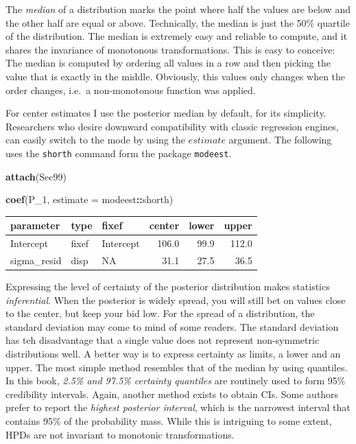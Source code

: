 \documentclass[]{svmono}
\newenvironment{Shaded}{\begin{snugshade}}{\end{snugshade}}
\newcommand{\KeywordTok}[1]{\textcolor[rgb]{0.13,0.29,0.53}{\textbf{#1}}}
\newcommand{\DataTypeTok}[1]{\textcolor[rgb]{0.13,0.29,0.53}{#1}}
\newcommand{\DecValTok}[1]{\textcolor[rgb]{0.00,0.00,0.81}{#1}}
\newcommand{\OperatorTok}[1]{\textcolor[rgb]{0.81,0.36,0.00}{\textbf{#1}}}
\newcommand{\NormalTok}[1]{#1}
\theoremstyle{definition}
\theoremstyle{definition}
\theoremstyle{definition}
\theoremstyle{remark}
\begin{document}
The \emph{median} of a distribution marks the point where half the
values are below and the other half are equal or above. Technically, the
median is just the 50\% quartile of the distribution. The median is
extremely easy and reliable to compute, and it shares the invariance of
monotonous transformations. This is easy to conceive: The median is
computed by ordering all values in a row and then picking the value that
is exactly in the middle. Obviously, this values only changes when the
order changes, i.e.~a non-monotonous function was applied.

For center estimates I use the posterior median by default, for its
simplicity. Researchers who desire downward compatibility with classic
regression engines, can easily switch to the mode by using the
\(estimate\) argument. The following uses the \texttt{shorth} command
form the package \texttt{modeest}.

\begin{Shaded}
\begin{Highlighting}[]
\KeywordTok{attach}\NormalTok{(Sec99)}
\end{Highlighting}
\end{Shaded}

\begin{Shaded}
\begin{Highlighting}[]
\KeywordTok{coef}\NormalTok{(P_}\DecValTok{1}\NormalTok{, }\DataTypeTok{estimate =}\NormalTok{ modeest}\OperatorTok{::}\NormalTok{shorth)}
\end{Highlighting}
\end{Shaded}

\begin{longtable}[]{@{}lllrrr@{}}
\toprule
parameter & type & fixef & center & lower & upper\tabularnewline
\midrule
\endhead
Intercept & fixef & Intercept & 106.0 & 99.9 & 112.0\tabularnewline
sigma\_resid & disp & NA & 31.1 & 27.5 & 36.5\tabularnewline
\bottomrule
\end{longtable}

Expressing the level of certainty of the posterior distribution makes
statistics \emph{inferential}. When the posterior is widely spread, you
will still bet on values close to the center, but keep your bid low. For
the spread of a distribution, the standard deviation may come to mind of
some readers. The standard deviation has teh disadvantage that a single
value does not represent non-symmetric distributions well. A better way
is to express certainty as limits, a lower and an upper. The most simple
method resembles that of the median by using quantiles. In this book,
\emph{2.5\% and 97.5\% certainty quantiles} are routinely used to form
95\% credibility intervals. Again, another method exists to obtain CIs.
Some authors prefer to report the \emph{highest posterior interval},
which is the narrowest interval that contains 95\% of the probability
mass. While this is intriguing to some extent, HPDs are not invariant to
monotonic transformations.
\end{document}
